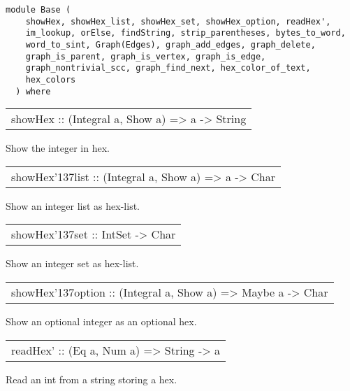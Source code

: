 \label{module:Base}
\haddockbeginheader
{\haddockverb\begin{verbatim}
module Base (
    showHex, showHex_list, showHex_set, showHex_option, readHex',
    im_lookup, orElse, findString, strip_parentheses, bytes_to_word,
    word_to_sint, Graph(Edges), graph_add_edges, graph_delete,
    graph_is_parent, graph_is_vertex, graph_is_edge,
    graph_nontrivial_scc, graph_find_next, hex_color_of_text,
    hex_colors
  ) where\end{verbatim}}
\haddockendheader

\begin{haddockdesc}
\item[\begin{tabular}{@{}l}
showHex :: (Integral a, Show a) => a -> String
\end{tabular}]
{\haddockbegindoc
Show the integer in hex.\par}
\end{haddockdesc}
\begin{haddockdesc}
\item[\begin{tabular}{@{}l}
showHex{\char '137}list :: (Integral a, Show a) => {\char 91}a{\char 93} -> {\char 91}Char{\char 93}
\end{tabular}]
{\haddockbegindoc
Show an integer list as hex-list.\par}
\end{haddockdesc}
\begin{haddockdesc}
\item[\begin{tabular}{@{}l}
showHex{\char '137}set :: IntSet -> {\char 91}Char{\char 93}
\end{tabular}]
{\haddockbegindoc
Show an integer set as hex-list.\par}
\end{haddockdesc}
\begin{haddockdesc}
\item[\begin{tabular}{@{}l}
showHex{\char '137}option :: (Integral a, Show a) => Maybe a -> {\char 91}Char{\char 93}
\end{tabular}]
{\haddockbegindoc
Show an optional integer as an optional hex.\par}
\end{haddockdesc}
\begin{haddockdesc}
\item[\begin{tabular}{@{}l}
readHex' :: (Eq a, Num a) => String -> a
\end{tabular}]
{\haddockbegindoc
Read an int from a string storing a hex.\par}
\end{haddockdesc}
